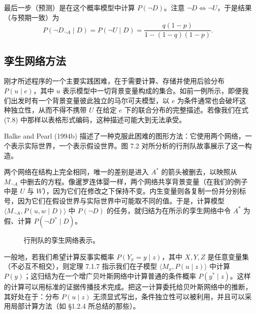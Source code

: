 最后一步（预测）是在这个概率模型中计算 $P(\neg D)$。注意 $\neg D\iff\neg U$，于是结果（与预期一致）为
\[
P(\neg D_{\neg A}\mid D)=P(\neg U\mid D)=\frac{q(1-p)}{1-(1-q)(1-p)}.
\]

\subsection{孪生网络方法}

刚才所述程序的一个主要实践困难，在于需要计算、存储并使用后验分布 $P(u\mid e)$，其中 $u$ 表示模型中一切背景变量构成的集合。如前一例所示，即便我们出发时有一个背景变量彼此独立的马尔可夫模型，以 $e$ 为条件通常也会破坏这种独立性，从而不得不携带 $U$ 在给定 $e$ 下的联合分布的完整描述。若像我们在式 \textup{(7.8)} 中那样以表格形式编码，这种描述可能大到无法承受。

Balke and Pearl (1994b) 描述了一种克服此困难的图形方法：它使用两个网络，一个表示实际世界，一个表示假设世界。图 7.2 对所分析的行刑队故事展示了这一构造。

两个网络在结构上完全相同，唯一的差别是进入 $A^*$ 的箭头被删去，以映照从 $M_{\neg A}$ 中删去的方程。像暹罗连体婴一样，两个网络共享背景变量（在我们的例子中是 $U$ 与 $W$），因为它们在修改之下保持不变。内生变量则各复制一份并分别标号，因为它们在假设世界与实际世界中可能取不同的值。于是，计算模型 $\langle M_{\neg A},P(u,w\mid D)\rangle$ 中 $P(\neg D)$ 的任务，就归结为在所示的孪生网络中令 $A^*$ 为假、计算 $P(\neg D^*\mid D)$。

\begin{figure}[htbp]
\centering
{}
\caption{行刑队的孪生网络表示。}
\label{fig:7.2}
\end{figure}

一般地，若我们希望计算反事实概率 $P(Y_x=y\mid z)$，其中 $X,Y,Z$ 是任意变量集（不必互不相交），则定理 7.1.7 指示我们在子模型 $\langle M_x,P(u\mid z)\rangle$ 中计算 $P(y)$；这归结为在一个增广贝叶斯网络中计算普通的条件概率 $P(y^*\mid z)$。这样的计算可以用标准的证据传播技术完成。把这一计算委托给贝叶斯网络中的推断，其好处在于：分布 $P(u\mid z)$ 无须显式写出，条件独立性可以被利用，并且可以采用局部计算方法（如 \S 1.2.4 所总结的那些）。

